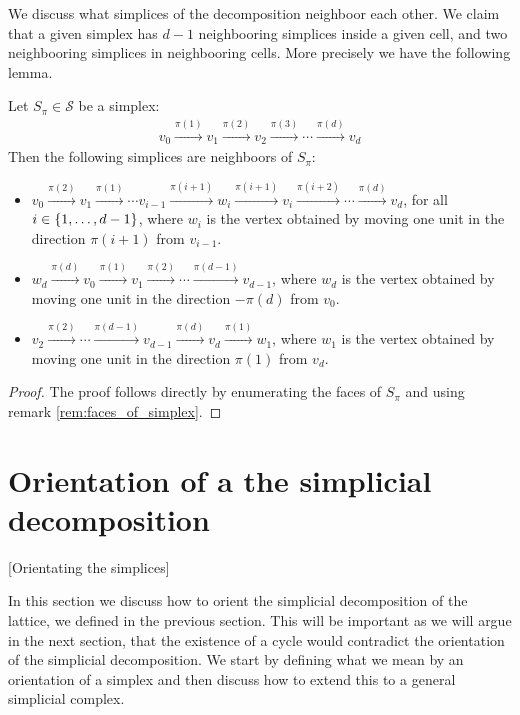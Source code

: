 We discuss what simplices of the decomposition neighboor each other. We claim that a given simplex has $d-1$ neighbooring simplices inside a given cell, and two neighbooring simplices in neighbooring cells. More precisely we have the following lemma.

\begin{lemma}
    Let $S_{\pi} \in \mathcal{S}$ be a simplex:
    \begin{align*}
        v_0 \xrightarrow{\pi(1)} v_1 \xrightarrow{\pi(2)} v_2 \xrightarrow{\pi(3)} \cdots \xrightarrow{\pi(d)} v_d
    \end{align*}
    Then the following simplices are neighboors of $S_{\pi}$:
    \begin{itemize}
        \item $v_0 \xrightarrow{\pi(2)} v_1 \xrightarrow{\pi(1)} \cdots v_{i-1} \xrightarrow{\pi(i+1)} w_i \xrightarrow{\pi(i+1)} v_{i} \xrightarrow{\pi(i+2)} \cdots \xrightarrow{\pi(d)} v_d$, for all $i \in \left\{1, \dots, d-1\right\}$, where $w_i$ is the vertex obtained by moving one unit in the direction $\pi(i+1)$ from $v_{i-1}$.
        \item $w_d \xrightarrow{\pi(d)} v_0 \xrightarrow{\pi(1)} v_1 \xrightarrow{\pi(2)} \cdots \xrightarrow{\pi(d-1)} v_{d-1}$, where $w_d$ is the vertex obtained by moving one unit in the direction $-\pi(d)$ from $v_{0}$.
        \item $v_2 \xrightarrow{\pi(2)} \cdots \xrightarrow{\pi(d-1)} v_{d-1} \xrightarrow{\pi(d)} v_d \xrightarrow{\pi(1)} w_1$, where $w_1$ is the vertex obtained by moving one unit in the direction $\pi(1)$ from $v_d$.
    \end{itemize}
\end{lemma}
\begin{proof}
    The proof follows directly by enumerating the faces of $S_{\pi}$ and using remark \ref{rem:faces_of_simplex}.
\end{proof}

\section{Orientation of a the simplicial decomposition}[Orientating the simplices]

In this section we discuss how to orient the simplicial decomposition of the lattice, we defined in the previous section. This will be important as we will argue in the next section, that the existence of a cycle would contradict the orientation of the simplicial decomposition. We start by defining what we mean by an orientation of a simplex and then discuss how to extend this to a general simplicial complex.

